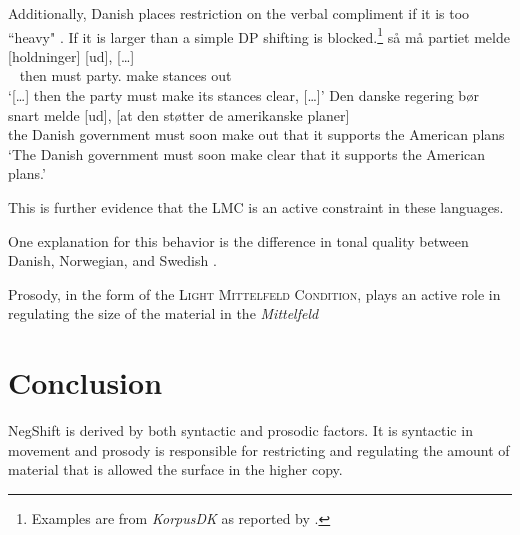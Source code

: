 \documentclass[12pt, letterpaper]{article}
\begin{document}
\ex Additionally, Danish places restriction on the verbal compliment if it is too ``heavy" \citep[44f]{mullerDanishHeadDrivenPhraseInpreparation}. 
	\ea If it is larger than a simple DP shifting is blocked.\footnote{Examples are from \emph{KorpusDK} as reported by \citet{mullerDanishHeadDrivenPhraseInpreparation}.} 
	\ex \gll {[…]} så må partiet melde [holdninger] [ud], {[…]}\\
	~ then must party.\Def{} make stances out\\
	\glt `{[…]} then the party must make its stances clear, {[…]}'
	\ex \gll Den danske regering bør snart melde [ud], [at den støtter de amerikanske planer]\\
	the Danish government must soon make out that it supports the American plans\\
	\glt `The Danish government must soon make clear that it supports the American plans.'
	\z 

\ex This is further evidence that the LMC is an active constraint in these languages. 

\ex One explanation for this behavior is the difference in tonal quality between Danish, Norwegian, and Swedish \citep{erteschik-shirVariationMainlandScandinavian2020}.
\z 

\begin{tcolorbox}[width=\linewidth]

Prosody, in the form of the \textsc{Light Mittelfeld Condition}, plays an active role in regulating the size of the material in the \emph{Mittelfeld}
\end{tcolorbox}
\section{Conclusion} \label{sec:CONCLUSION}

\begin{tcolorbox}[width=\linewidth]
\centering
NegShift is derived by both syntactic and prosodic factors. It is syntactic in movement and prosody is responsible for restricting and regulating the amount of material that is allowed the surface in the higher copy.
\end{tcolorbox}


\printbibliography[heading=bibintoc]
\end{document}
